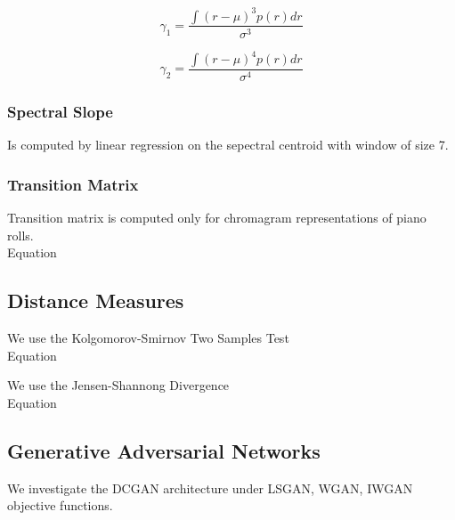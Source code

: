 \begin{equation}
    \gamma_1 = \frac{\int (r - \mu)^3 p(r) dr}{\sigma^3}
\end{equation}

\begin{equation}
    \gamma_2 = \frac{\int (r - \mu)^4 p(r) dr}{\sigma^4}
\end{equation}
\subsubsection{Spectral Slope}
Is computed by linear regression on the sepectral centroid with window of size
7.

\subsubsection{Transition Matrix}
Transition matrix is computed only for chromagram representations of piano
rolls. \\
Equation

\subsection{Distance Measures}
We use the Kolgomorov-Smirnov Two Samples Test\\
Equation

We use the Jensen-Shannong Divergence\\
Equation

\subsection{Generative Adversarial Networks}
We investigate the DCGAN architecture under LSGAN, WGAN, IWGAN objective
functions.
